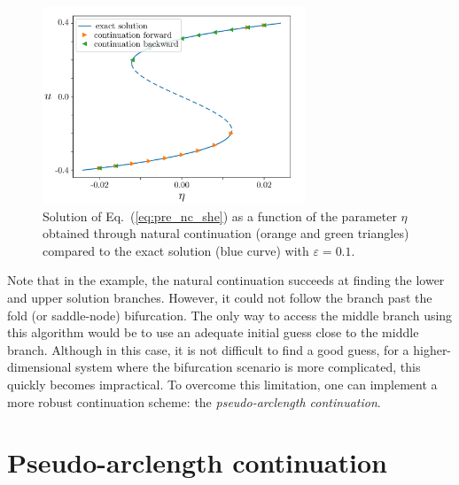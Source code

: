 \begin{exmp}
    \begin{figure}[h]
        \centering
        \includegraphics[width=0.7\textwidth]{scripts/figures/natural_continuation_she.png}
        \caption[short]{Solution of Eq.~(\ref{eq:pre_nc_she}) as a function of the parameter $\eta$ obtained
        through natural continuation (orange and green triangles) compared to the exact solution (blue curve)
        with $\varepsilon = 0.1$.}
        \label{fig:pre_nc_she}
    \end{figure}
\end{exmp}

Note that in the example, the natural continuation succeeds at finding the lower and upper 
solution branches. However, it could not follow the branch past the fold 
(or saddle-node) bifurcation. The only way to access the middle branch using 
this algorithm would be to use an adequate initial guess close
to the middle branch. 
Although in this case, it is not difficult to find a good guess, 
for a higher-dimensional system where the
bifurcation scenario is more complicated, 
this quickly becomes impractical. To overcome this limitation,
one can implement a more robust continuation scheme: 
the {\em pseudo-arclength continuation}.

\section{Pseudo-arclength continuation}


